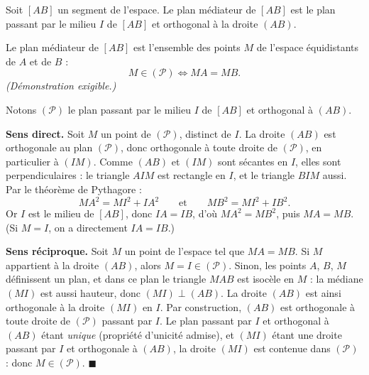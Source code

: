 \documentclass[11pt]{article}
\newcommand{\cle}[1]{{\popxbold\color{popdark}#1}}
\begin{document}
\begin{definition}
Soit $[AB]$ un segment de l'espace. Le \cle{plan médiateur} de $[AB]$ est le plan passant par le milieu $I$ de $[AB]$ et orthogonal à la droite $(AB)$.
\end{definition}

\begin{propriete}
Le plan médiateur de $[AB]$ est l'ensemble des points $M$ de l'espace équidistants de $A$ et de $B$ :
\[ M \in (\mathcal{P}) \iff MA = MB. \]
\emph{(Démonstration exigible.)}
\end{propriete}

\begin{experience}
Notons $(\mathcal{P})$ le plan passant par le milieu $I$ de $[AB]$ et orthogonal à $(AB)$.

\textbf{Sens direct.} Soit $M$ un point de $(\mathcal{P})$, distinct de $I$. La droite $(AB)$ est orthogonale au plan $(\mathcal{P})$, donc orthogonale à toute droite de $(\mathcal{P})$, en particulier à $(IM)$. Comme $(AB)$ et $(IM)$ sont sécantes en $I$, elles sont perpendiculaires : le triangle $AIM$ est rectangle en $I$, et le triangle $BIM$ aussi. Par le théorème de Pythagore :
\[ MA^2 = MI^2 + IA^2 \qquad \text{et} \qquad MB^2 = MI^2 + IB^2. \]
Or $I$ est le milieu de $[AB]$, donc $IA = IB$, d'où $MA^2 = MB^2$, puis $MA = MB$. (Si $M = I$, on a directement $IA = IB$.)

\textbf{Sens réciproque.} Soit $M$ un point de l'espace tel que $MA = MB$. Si $M$ appartient à la droite $(AB)$, alors $M = I \in (\mathcal{P})$. Sinon, les points $A$, $B$, $M$ définissent un plan, et dans ce plan le triangle $MAB$ est isocèle en $M$ : la médiane $(MI)$ est aussi hauteur, donc $(MI) \perp (AB)$. La droite $(AB)$ est ainsi orthogonale à la droite $(MI)$ en $I$. Par construction, $(AB)$ est orthogonale à toute droite de $(\mathcal{P})$ passant par $I$. Le plan passant par $I$ et orthogonal à $(AB)$ étant \emph{unique} (propriété d'unicité admise), et $(MI)$ étant une droite passant par $I$ et orthogonale à $(AB)$, la droite $(MI)$ est contenue dans $(\mathcal{P})$ : donc $M \in (\mathcal{P})$. \hfill $\blacksquare$
\end{experience}
\end{document}
